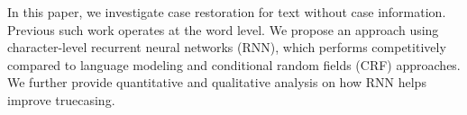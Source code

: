 In this paper, we investigate case restoration for text without case information. Previous such work operates at the word level. We propose an approach using character-level recurrent neural networks (RNN), which performs competitively compared to language modeling and conditional random fields (CRF) approaches. We further provide quantitative and qualitative analysis on how RNN helps improve truecasing.
